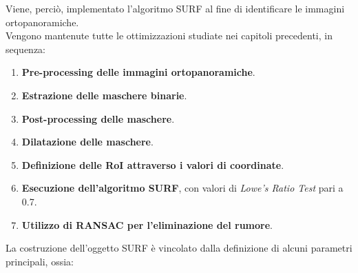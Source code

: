 \documentclass[12pt,a4paper,openright,twoside]{book}
\begin{document}
Viene, perciò, implementato l'algoritmo SURF al fine di identificare le immagini ortopanoramiche.\\
Vengono mantenute tutte le ottimizzazioni studiate nei capitoli precedenti, in sequenza:
\begin{enumerate}
\item \textbf{Pre-processing delle immagini ortopanoramiche}.
\item \textbf{Estrazione delle maschere binarie}.
\item \textbf{Post-processing delle maschere}.
\item \textbf{Dilatazione delle maschere}.
\item \textbf{Definizione delle RoI attraverso i valori di coordinate}.
\item \textbf{Esecuzione dell'algoritmo SURF}, con valori di {\itshape Lowe's Ratio Test} pari a 0.7.
\item \textbf{Utilizzo di RANSAC per l'eliminazione del rumore}.
\end{enumerate}
La costruzione dell'oggetto SURF è vincolato dalla definizione di alcuni parametri principali, ossia:
\end{document}
